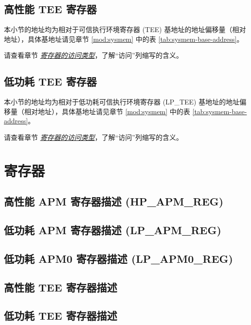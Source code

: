 \documentclass[main\_\_CN.tex]{subfiles}
\begin{document}


\subsection{高性能 TEE 寄存器}

本小节的地址均为相对于可信执行环境寄存器 (TEE) 基地址的地址偏移量（相对地址），具体基地址请见章节 \ref{mod:sysmem} \textit{} 中的表 \ref{tab:sysmem-base-address}。

请查看章节 \hyperref[glossary-access-types]{\textit{寄存器的访问类型}}，了解“访问”列缩写的含义。




\subsection{低功耗 TEE 寄存器}

本小节的地址均为相对于低功耗可信执行环境寄存器 (LP\_TEE) 基地址的地址偏移量（相对地址），具体基地址请见章节 \ref{mod:sysmem} \textit{} 中的表 \ref{tab:sysmem-base-address}。

请查看章节 \hyperref[glossary-access-types]{\textit{寄存器的访问类型}}，了解“访问”列缩写的含义。





\clearpage
\section{寄存器}

\subsection{高性能 APM 寄存器描述 (HP\_APM\_REG)}


\subsection{低功耗 APM 寄存器描述 (LP\_APM\_REG)}


\subsection{低功耗 APM0 寄存器描述 (LP\_APM0\_REG)}


\subsection{高性能 TEE 寄存器描述}


\subsection{低功耗 TEE 寄存器描述}

\end{document}
